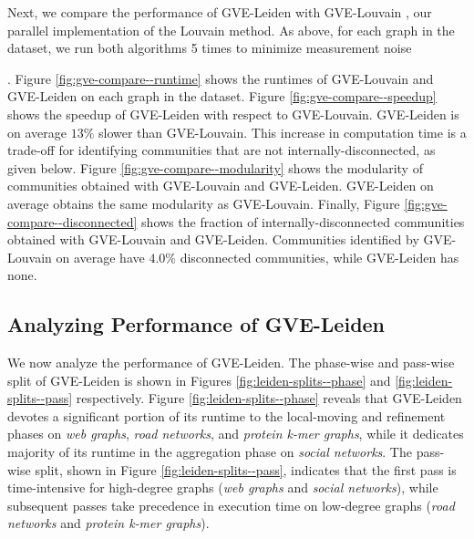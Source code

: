 
Next, we compare the performance of GVE-Leiden with GVE-Louvain \cite{sahu2023gvelouvain}, our parallel implementation of the Louvain method. As above, for each graph in the dataset, we run both algorithms 5 times to minimize measurement noise. Figure \ref{fig:gve-compare--runtime} shows the runtimes of GVE-Louvain and GVE-Leiden on each graph in the dataset. Figure \ref{fig:gve-compare--speedup} shows the speedup of GVE-Leiden with respect to GVE-Louvain. GVE-Leiden is on average $13\%$ slower than GVE-Louvain. This increase in computation time is a trade-off for identifying communities that are not internally-disconnected, as given below. Figure \ref{fig:gve-compare--modularity} shows the modularity of communities obtained with GVE-Louvain and GVE-Leiden. GVE-Leiden on average obtains the same modularity as GVE-Louvain. Finally, Figure \ref{fig:gve-compare--disconnected} shows the fraction of internally-disconnected communities obtained with GVE-Louvain and GVE-Leiden. Communities identified by GVE-Louvain on average have $4.0\%$ disconnected communities, while GVE-Leiden has none.








\subsection{Analyzing Performance of GVE-Leiden}

We now analyze the performance of GVE-Leiden. The phase-wise and pass-wise split of GVE-Leiden is shown in Figures \ref{fig:leiden-splits--phase} and \ref{fig:leiden-splits--pass} respectively. Figure \ref{fig:leiden-splits--phase} reveals that GVE-Leiden devotes a significant portion of its runtime to the local-moving and refinement phases on \textit{web graphs}, \textit{road networks}, and \textit{protein k-mer graphs}, while it dedicates majority of its runtime in the aggregation phase on \textit{social networks}. The pass-wise split, shown in Figure \ref{fig:leiden-splits--pass}, indicates that the first pass is time-intensive for high-degree graphs (\textit{web graphs} and \textit{social networks}), while subsequent passes take precedence in execution time on low-degree graphs (\textit{road networks} and \textit{protein k-mer graphs}).

